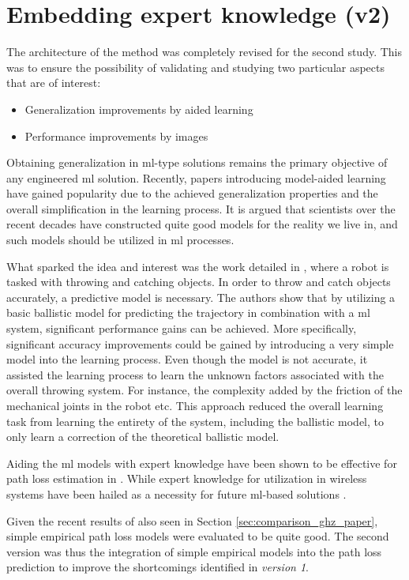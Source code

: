 \section{Embedding expert knowledge (v2)}
The architecture of the method was completely revised for the second study. This was to ensure the possibility of validating and studying two particular aspects that are of interest:

\begin{itemize}
    \item Generalization improvements by aided learning
    \item Performance improvements by images
\end{itemize}

Obtaining generalization in \gls{ml}-type solutions remains the primary objective of any engineered \gls{ml} solution. Recently, papers introducing model-aided learning have gained popularity due to the achieved generalization properties and the overall simplification in the learning process. It is argued that scientists over the recent decades have constructed quite good models for the reality we live in, and such models should be utilized in \gls{ml} processes. 

What sparked the idea and interest was the work detailed in \cite{Zheng2016}, where a robot is tasked with throwing and catching objects. In order to throw and catch objects accurately, a predictive model is necessary. The authors show that by utilizing a basic ballistic model for predicting the trajectory in combination with a \gls{ml} system, significant performance gains can be achieved. More specifically, significant accuracy improvements could be gained by introducing a very simple model into the learning process. Even though the model is not accurate, it assisted the learning process to learn the unknown factors associated with the overall throwing system. For instance, the complexity added by the friction of the mechanical joints in the robot etc. This approach reduced the overall learning task from learning the entirety of the system, including the ballistic model, to only learn a correction of the theoretical ballistic model.

Aiding the \gls{ml} models with expert knowledge have been shown to be effective for path loss estimation in \cite{Cavalcanti2017}. While expert knowledge for utilization in wireless systems have been hailed as a necessity for future \gls{ml}-based solutions \cite{Zappone2019}.

Given the recent results of \cite{Thrane2019ComparisonGHz} also seen in Section \ref{sec:comparison_ghz_paper}, simple empirical path loss models were evaluated to be quite good. The second version was thus the integration of simple empirical models into the path loss prediction to improve the shortcomings identified in \emph{version 1}. 

